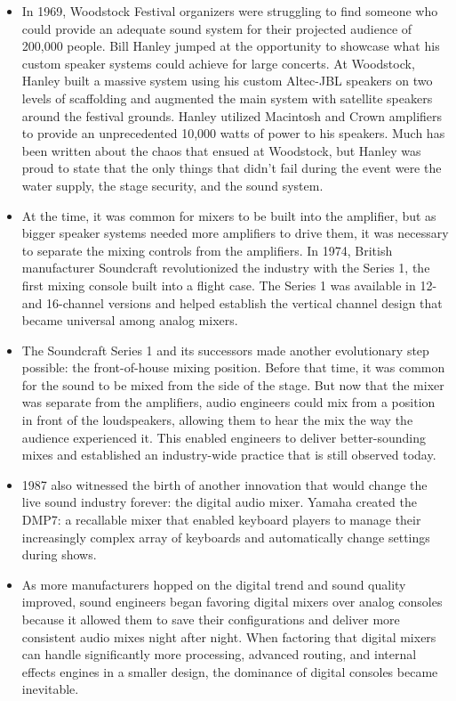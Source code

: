 \documentclass[12pt]{article}
\begin{document}
\begin{itemize}
            \item In 1969, Woodstock Festival organizers were struggling to find someone who could provide an adequate sound system for their projected audience of 200,000 people. Bill Hanley jumped at the opportunity to showcase what his custom speaker systems could achieve for large concerts. At Woodstock, Hanley built a massive system using his custom Altec-JBL speakers on two levels of scaffolding and augmented the main system with satellite speakers around the festival grounds. Hanley utilized Macintosh and Crown amplifiers to provide an unprecedented 10,000 watts of power to his speakers. Much has been written about the chaos that ensued at Woodstock, but Hanley was proud to state that the only things that didn't fail during the event were the water supply, the stage security, and the sound system.
            \item At the time, it was common for mixers to be built into the amplifier, but as bigger speaker systems needed more amplifiers to drive them, it was necessary to separate the mixing controls from the amplifiers. In 1974, British manufacturer Soundcraft revolutionized the industry with the Series 1, the first mixing console built into a flight case. The Series 1 was available in 12- and 16-channel versions and helped establish the vertical channel design that became universal among analog mixers.
            \item The Soundcraft Series 1 and its successors made another evolutionary step possible: the front-of-house mixing position. Before that time, it was common for the sound to be mixed from the side of the stage. But now that the mixer was separate from the amplifiers, audio engineers could mix from a position in front of the loudspeakers, allowing them to hear the mix the way the audience experienced it. This enabled engineers to deliver better-sounding mixes and established an industry-wide practice that is still observed today.
            \item 1987 also witnessed the birth of another innovation that would change the live sound industry forever: the digital audio mixer. Yamaha created the DMP7: a recallable mixer that enabled keyboard players to manage their increasingly complex array of keyboards and automatically change settings during shows.
            \item As more manufacturers hopped on the digital trend and sound quality improved, sound engineers began favoring digital mixers over analog consoles because it allowed them to save their configurations and deliver more consistent audio mixes night after night. When factoring that digital mixers can handle significantly more processing, advanced routing, and internal effects engines in a smaller design, the dominance of digital consoles became inevitable.

\end{itemize}
\end{document}
